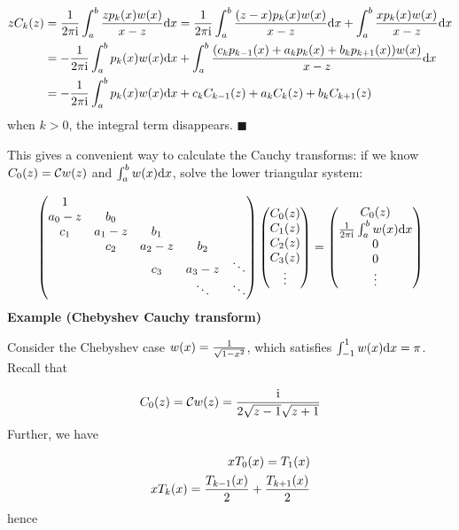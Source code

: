 \documentclass[12pt,a4paper]{article}
\def\D{ {\rm d} }
\def\I{ {\rm i} }
\def\C{ {\mathbb C} }
\def\dx{\D x}
\begin{document}
\begin{align*}
z C_k(z) &= {1 \over 2 \pi \I} \int_a^b {z p_k(x) w(x) \over x -z} \dx  = {1 \over 2 \pi \I} \int_a^b {(z -x) p_k(x) w(x) \over x -z} \dx  +  \int_a^b {x p_k(x) w(x) \over x -z} \dx \\
  &= -{1 \over 2 \pi \I} \int_a^b p_k(x) w(x)  \dx +  \int_a^b {(c_k p_{k-1}(x) + a_k p_k(x) + b_k p_{k+1}(x)) w(x) \over x -z} \dx \\
  &= -{1 \over 2 \pi \I} \int_a^b p_k(x) w(x)  \dx + c_k C_{k-1}(z) + a_k C_k(z) + b_k C_{k+1}(z)
\end{align*}
when $k > 0$, the integral term disappears. \ensuremath{\blacksquare}

This gives a convenient way to calculate the Cauchy transforms: if we know $C_0(z) ={\cal C}w(z)$ and $\int_a^b w(x) \dx$, solve the lower triangular system:

\[
\begin{pmatrix}
1 \\
a_0-z & b_0 \\
c_1 & a_1-z & b_1 \\
&c_2 & a_2-z & b_2 \\
&& c_3 & a_3-z &\ddots\\
&&&\ddots & \ddots
\end{pmatrix}\begin{pmatrix}C_0(z) \\C_1(z) \\C_2(z) \\C_3(z) \\ \vdots \end{pmatrix} = \begin{pmatrix}C_0(z) \\{1 \over 2 \pi \I} \int_a^b w(x) \dx \\0 \\0 \\ \vdots \end{pmatrix}
\]
\textbf{Example (Chebyshev Cauchy transform)}

Consider the Chebyshev case $w(x) = {1 \over \sqrt{1-x^2}}$, which satisfies $\int_{-1}^1 w(x) \dx = {\pi}$. Recall that

\[
    C_0(z) ={\cal C}w(z) = { \I \over 2\sqrt{z-1}\sqrt{z+1}}
\]
Further, we have


\begin{align*}
x T_0(x) = T_1(x) \\
x T_k(x) = {T_{k-1}(x) \over 2} + { T_{k+1}(x) \over 2}
\end{align*}
hence
\end{document}
